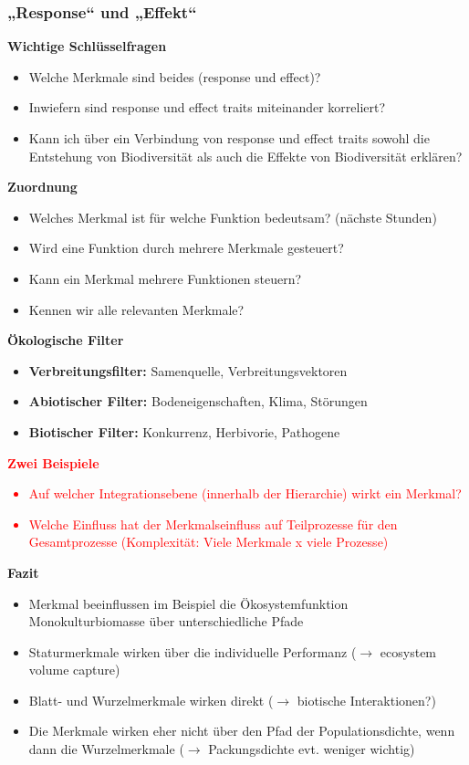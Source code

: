 \newpage
\subsubsection{„Response“ und „Effekt“}
\textbf{Wichtige Schlüsselfragen}
\begin{itemize}
	\item Welche Merkmale sind beides (response und effect)?
	\item Inwiefern sind response und effect traits miteinander korreliert?
	\item Kann ich über ein Verbindung von response und effect traits sowohl die Entstehung von Biodiversität als auch die Effekte von Biodiversität erklären?
\end{itemize}

\textbf{Zuordnung}
\begin{itemize}
	\item Welches Merkmal ist für welche Funktion bedeutsam? (nächste Stunden)
	\item Wird eine Funktion durch mehrere Merkmale gesteuert?
	\item Kann ein Merkmal mehrere Funktionen steuern?
	\item Kennen wir alle relevanten Merkmale?
\end{itemize}

\textbf{Ökologische Filter}
\begin{itemize}
	\item \textbf{Verbreitungsfilter:} Samenquelle, Verbreitungsvektoren
	\item \textbf{Abiotischer Filter:} Bodeneigenschaften, Klima, Störungen
	\item \textbf{Biotischer Filter:} Konkurrenz, Herbivorie, Pathogene
\end{itemize}

\textcolor{red}{\textbf{Zwei Beispiele}
\begin{itemize}
	\item Auf welcher Integrationsebene (innerhalb der Hierarchie) wirkt ein Merkmal?
	\item Welche Einfluss hat der Merkmalseinfluss auf Teilprozesse für den Gesamtprozesse (Komplexität: Viele Merkmale x viele Prozesse)
\end{itemize}}

\textbf{Fazit}
\begin{itemize}
	\item Merkmal beeinflussen im Beispiel die Ökosystemfunktion Monokulturbiomasse über unterschiedliche Pfade
	\item Staturmerkmale wirken über die individuelle Performanz ($\rightarrow$ ecosystem volume capture)
	\item Blatt- und Wurzelmerkmale wirken direkt ($\rightarrow$ biotische Interaktionen?)
	\item Die Merkmale wirken eher nicht über den Pfad der Populationsdichte, wenn dann die Wurzelmerkmale ($\rightarrow$ Packungsdichte evt. weniger wichtig)
\end{itemize}